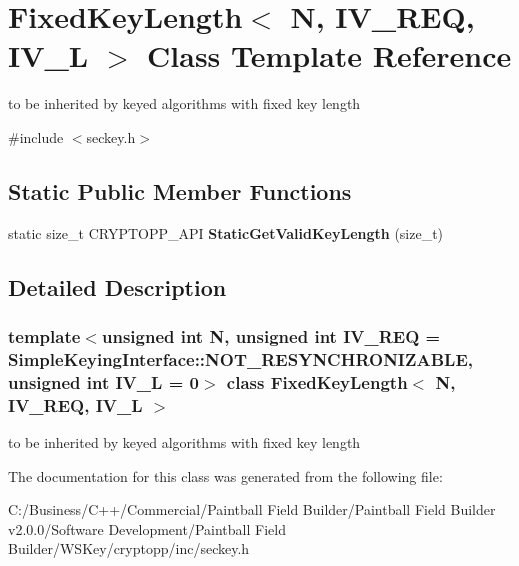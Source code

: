 \hypertarget{class_fixed_key_length}{
\section{FixedKeyLength$<$ N, IV\_\-REQ, IV\_\-L $>$ Class Template Reference}
\label{class_fixed_key_length}
}


to be inherited by keyed algorithms with fixed key length  


{\ttfamily \#include $<$seckey.h$>$}\subsection*{Static Public Member Functions}
\begin{DoxyCompactItemize}
\item 
\hypertarget{class_fixed_key_length_a7daadb7ff291d07a4f013174044af56e}{
static size\_\-t CRYPTOPP\_\-API {\bfseries StaticGetValidKeyLength} (size\_\-t)}
\label{class_fixed_key_length_a7daadb7ff291d07a4f013174044af56e}

\end{DoxyCompactItemize}


\subsection{Detailed Description}
\subsubsection*{template$<$unsigned int N, unsigned int IV\_\-REQ = SimpleKeyingInterface::NOT\_\-RESYNCHRONIZABLE, unsigned int IV\_\-L = 0$>$ class FixedKeyLength$<$ N, IV\_\-REQ, IV\_\-L $>$}

to be inherited by keyed algorithms with fixed key length 

The documentation for this class was generated from the following file:\begin{DoxyCompactItemize}
\item 
C:/Business/C++/Commercial/Paintball Field Builder/Paintball Field Builder v2.0.0/Software Development/Paintball Field Builder/WSKey/cryptopp/inc/seckey.h\end{DoxyCompactItemize}
